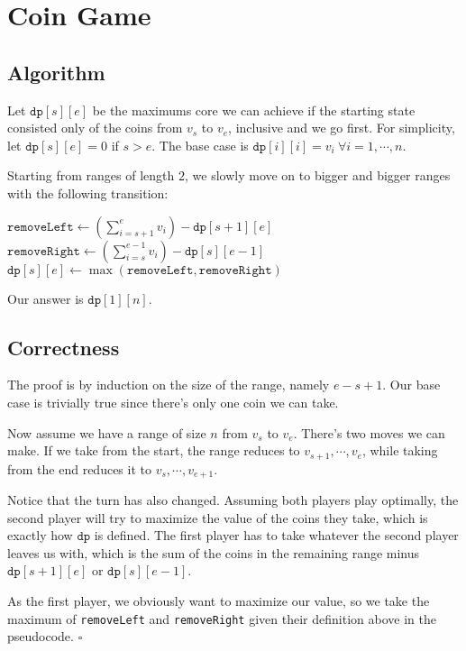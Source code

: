 \documentclass[12pt]{article}
\begin{document}
\section{Coin Game}

\subsection{Algorithm}

Let $\texttt{dp}[s][e]$ be the maximums core we can achieve if the starting state
consisted only of the coins from $v_s$ to $v_e$, inclusive and we go first.
For simplicity, let $\texttt{dp}[s][e]=0$ if $s>e$.
The base case is $\texttt{dp}[i][i]=v_i\ \forall i=1,\cdots, n$.

Starting from ranges of length $2$, we slowly move on to bigger and bigger ranges
with the following transition:

\begin{algorithmic}[1]
    \State $\texttt{removeLeft} \gets \left(\sum_{i=s+1}^{e} v_i\right)-\texttt{dp}[s+1][e]$
    \State $\texttt{removeRight} \gets \left(\sum_{i=s}^{e-1} v_i\right)-\texttt{dp}[s][e-1]$
    \State $\texttt{dp}[s][e] \gets \max(\texttt{removeLeft}, \texttt{removeRight})$
\end{algorithmic}

Our answer is $\texttt{dp}[1][n]$.

\subsection{Correctness}

The proof is by induction on the size of the range, namely $e-s+1$.
Our base case is trivially true since there's only one coin we can take.

Now assume we have a range of size $n$ from $v_s$ to $v_e$.
There's two moves we can make.
If we take from the start, the range reduces to $v_{s+1}, \cdots, v_e$,
while taking from the end reduces it to $v_s, \cdots, v_{e+1}$.

Notice that the turn has also changed.
Assuming both players play optimally, the second player will try to maximize
the value of the coins they take, which is exactly how $\texttt{dp}$ is defined.
The first player has to take whatever the second player leaves us with,
which is the sum of the coins in the remaining range
minus $\texttt{dp}[s+1][e]$ or $\texttt{dp}[s][e-1]$.

As the first player, we obviously want to maximize our value,
so we take the maximum of \texttt{removeLeft} and \texttt{removeRight}
given their definition above in the pseudocode. $\square$
\end{document}
